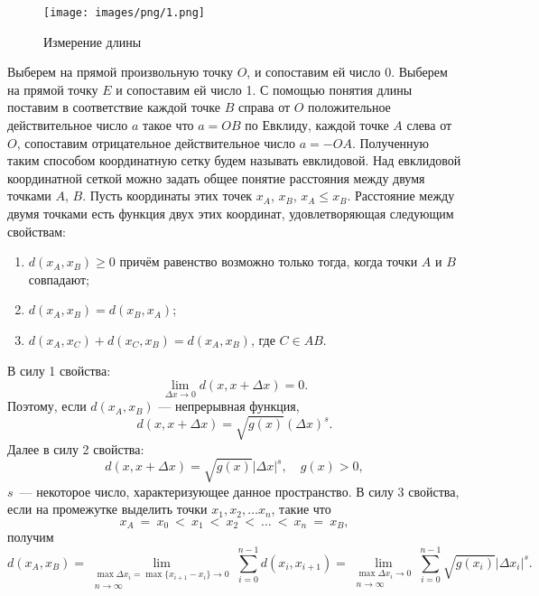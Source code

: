 \documentclass[a4paper,14pt]{extreport} %
\begin{document}
	\begin{figure}[h]
		\centering
		\texttt{[image: images/png/1.png]}
		\caption{Измерение длины}
		\label{fig1g}
	\end{figure}
	
	Выберем на прямой произвольную точку $O$, и сопоставим ей число 0. Выберем на прямой точку $E$ и сопоставим ей число 1. С помощью понятия длины поставим в соответствие каждой точке $B$ справа от $O$ положительное действительное число $a$ такое что $a = OB$ по Евклиду, каждой точке $A$ слева от $O$, сопоставим отрицательное действительное число $a = - OA$. Полученную таким способом координатную сетку будем называть евклидовой. Над евклидовой координатной сеткой можно задать общее понятие расстояния между двумя точками $A$, $B$. Пусть координаты этих точек $x_A$, $x_B$, $x_A \leqslant x_B$. Расстояние между двумя точками есть функция двух этих координат, удовлетворяющая следующим свойствам:
	
	\begin{enumerate}
		\item $d(x_A, x_B) \geqslant 0$ причём равенство возможно только тогда, когда точки $A$ и $B$ совпадают;
		\item $d(x_A, x_B) = d(x_B, x_A)$;
		\item $d(x_A, x_C) + d(x_C, x_B) = d(x_A, x_B)$, где $C\in AB$.
	\end{enumerate}
	
	В силу 1 свойства:
	\[
		\lim\limits_{\Delta x \rightarrow 0} d(x, x + \Delta x) = 0.
	\]
	Поэтому, если $d(x_A, x_B)$ --- непрерывная функция,
	\[
		d(x, x + \Delta x) = \sqrt{g(x)} (\Delta x)^s.
	\]	
	Далее в силу 2 свойства:
	\[
		d(x, x + \Delta x) = \sqrt{g(x)} |\Delta x|^s, \quad g(x) > 0,
	\]
	$s$~--- некоторое число, характеризующее данное пространство. В силу 3 свойства, если на промежутке выделить точки $x_1, x_2, \ldots x_n$, такие что
	\[
		x_A~=~x_0~<~x_1~<~x_2~<~\ldots~<~x_n~=~x_B,
	\]
	получим
	\[
		d(x_A, x_B) = 
		\lim\limits_{\substack{\max \Delta x_i = \max \{x_{i+1} - x_i\} \to 0 \\ n \to \infty}} \sum\limits_{i = 0}^{n-1} d(x_i, x_{i+1}) =
		\lim\limits_{\substack{\max \Delta x_i \to 0 \\ n \to \infty}} \sum\limits_{i = 0}^{n-1} \sqrt{g(x_i)} |\Delta x_i|^s.
	\]
	
\end{document}
